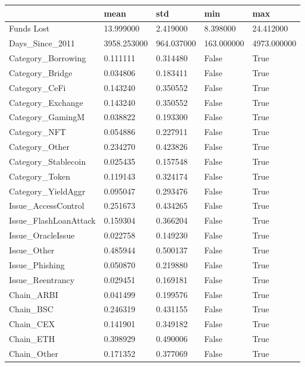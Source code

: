 \begin{tabular}{lllll}
\toprule
 & mean & std & min & max \\
\midrule
Funds Lost & 13.999000 & 2.419000 & 8.398000 & 24.412000 \\
Days_Since_2011 & 3958.253000 & 964.037000 & 163.000000 & 4973.000000 \\
Category_Borrowing & 0.111111 & 0.314480 & False & True \\
Category_Bridge & 0.034806 & 0.183411 & False & True \\
Category_CeFi & 0.143240 & 0.350552 & False & True \\
Category_Exchange & 0.143240 & 0.350552 & False & True \\
Category_GamingM & 0.038822 & 0.193300 & False & True \\
Category_NFT & 0.054886 & 0.227911 & False & True \\
Category_Other & 0.234270 & 0.423826 & False & True \\
Category_Stablecoin & 0.025435 & 0.157548 & False & True \\
Category_Token & 0.119143 & 0.324174 & False & True \\
Category_YieldAggr & 0.095047 & 0.293476 & False & True \\
Issue_AccessControl & 0.251673 & 0.434265 & False & True \\
Issue_FlashLoanAttack & 0.159304 & 0.366204 & False & True \\
Issue_OracleIssue & 0.022758 & 0.149230 & False & True \\
Issue_Other & 0.485944 & 0.500137 & False & True \\
Issue_Phishing & 0.050870 & 0.219880 & False & True \\
Issue_Reentrancy & 0.029451 & 0.169181 & False & True \\
Chain_ARBI & 0.041499 & 0.199576 & False & True \\
Chain_BSC & 0.246319 & 0.431155 & False & True \\
Chain_CEX & 0.141901 & 0.349182 & False & True \\
Chain_ETH & 0.398929 & 0.490006 & False & True \\
Chain_Other & 0.171352 & 0.377069 & False & True \\
\bottomrule
\end{tabular}
